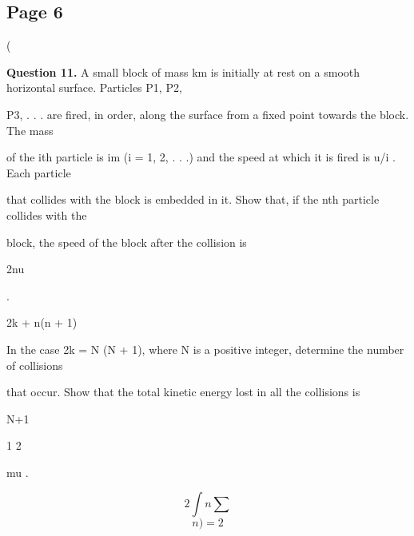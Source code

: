 \documentclass[12pt]{article}
\begin{document}
\subsection*{Page 6}
\begin{flushleft}
(\par
\bigskip\textbf{Question 11.} A small block of mass km is initially at rest on a smooth horizontal surface. Particles P1, P2,\par
P3, . . . are fired, in order, along the surface from a fixed point towards the block. The mass\par
of the ith particle is im (i = 1, 2, . . .) and the speed at which it is fired is u/i . Each particle\par
that collides with the block is embedded in it. Show that, if the nth particle collides with the\par
block, the speed of the block after the collision is\par
2nu\par
.\par
2k + n(n + 1)\par
In the case 2k = N (N + 1), where N is a positive integer, determine the number of collisions\par
that occur. Show that the total kinetic energy lost in all the collisions is\par
N+1\par
1 2\par
mu .\par
\[2 \int n \sum\]
\[n)=2\]
\end{flushleft}
\end{document}
